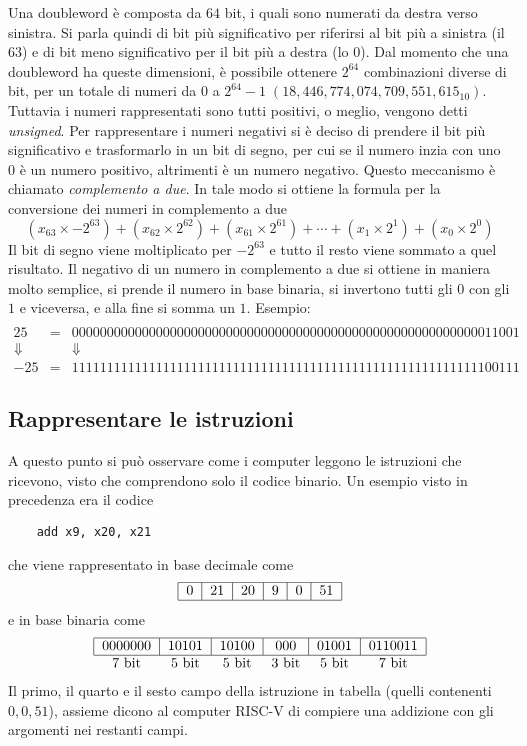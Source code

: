 \documentclass[a4paper,12pt]{article}
\theoremstyle{break}
\numberwithin{equation}{section}
\begin{document}
Una doubleword è composta da \(64\) bit, i quali sono numerati da destra verso sinistra. Si parla quindi di bit più significativo per riferirsi al bit più a sinistra (il \(63\)) e di bit meno significativo per il bit più a destra (lo \(0\)). 
Dal momento che una doubleword ha queste dimensioni, è possibile ottenere \(2^{64}\) combinazioni diverse di bit, per un totale di numeri da \(0\) a \(2^{64}-1 \; (18,446,774,074,709,551,615_{10})\).
Tuttavia i numeri rappresentati sono tutti positivi, o meglio, vengono detti \textit{unsigned}. Per rappresentare i numeri negativi si è deciso di prendere il bit più significativo e trasformarlo in un bit di segno, per cui se il numero inzia con uno \(0\) è un numero positivo, altrimenti è un numero negativo. Questo meccanismo è chiamato \textit{complemento a due}.
In tale modo si ottiene la formula per la conversione dei numeri in complemento a due 
\[
    (x_{63} \times -2^{63}) + (x_{62} \times 2^{62}) + (x_{61} \times 2^{61}) + \cdots + (x_1 \times 2^1) + (x_0 \times 2^0)
\]
Il bit di segno viene moltiplicato per \(-2^{63}\) e tutto il resto viene sommato a quel risultato. Il negativo di un numero in complemento a due si ottiene in maniera molto semplice, si prende il numero in base binaria, si invertono tutti gli \(0\) con gli \(1\) e viceversa, e alla fine si somma un \(1\). Esempio: 
\[
\begin{array}{rcc}
     \\
    25 & = &0000000000000000000000000000000000000000000000000000000000011001  \\
    \Downarrow &  &\Downarrow  \\
    -25 & = &1111111111111111111111111111111111111111111111111111111111100111 
\end{array}
\]
\subsection{Rappresentare le istruzioni}
A questo punto si può osservare come i computer leggono le istruzioni che ricevono, visto che comprendono solo il codice binario. Un esempio visto in precedenza era il codice 
\begin{verbatim}
    add x9, x20, x21
\end{verbatim}
che viene rappresentato in base decimale come 
\[
\begin{tabular}{|c|c|c|c|c|c|}
    \hline 
    0 & 21 & 20 & 9 & 0 & 51 \\
    \hline
\end{tabular}
\]
e in base binaria come 
\[
\begin{tabular}{|c|c|c|c|c|c|}
    \hline 
    0000000  & 10101  & 10100  & 000  & 01001 & 0110011 \\
    \hline
    \multicolumn{1}{c}{7 bit} & \multicolumn{1}{c}{5 bit} & \multicolumn{1}{c}{5 bit} & \multicolumn{1}{c}{3 bit} & \multicolumn{1}{c}{5 bit} & \multicolumn{1}{c}{7 bit}
\end{tabular}
\]
Il primo, il quarto e il sesto campo della istruzione in tabella (quelli contenenti \(0, 0, 51\)), assieme dicono al computer RISC-V di compiere una addizione con gli argomenti nei restanti campi. 
\end{document}

